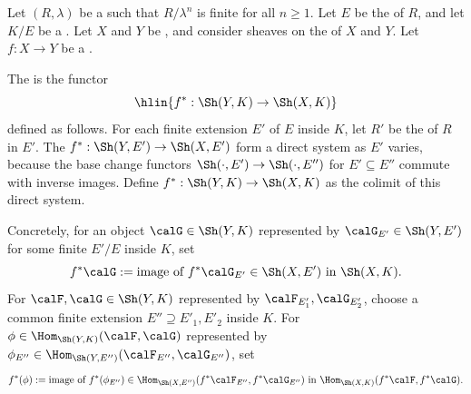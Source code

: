 \begin{definition} \label{definition:inverse_image_functor_on_etale_sheaves_with_algebraic_adic_coefficients_on_a_noetherian_scheme}
Let $(R, \lambda)$ be a   such that $R/\lambda^n$ is finite for all $n \geq 1$. Let $E$ be the  of $R$, and let $K/E$ be a . Let $X$ and $Y$ be , and consider sheaves on the  of $X$ and $Y$. Let $f: X \to Y$ be a .

The  is the functor
$$\hlin{f^* : \Sh(Y, K) \to \Sh(X, K)}$$
defined as follows. For each finite extension $E'$ of $E$ inside $K$, let $R'$ be the  of $R$ in $E'$. The  $f^*: \Sh(Y, E') \to \Sh(X, E')$ form a direct system as $E'$ varies, because the base change functors $\Sh(\cdot, E') \to \Sh(\cdot, E'')$ for $E' \subseteq E''$ commute with inverse images. Define $f^*: \Sh(Y, K) \to \Sh(X, K)$ as the colimit of this direct system.

Concretely, for an object $\calG \in \Sh(Y, K)$ represented by $\calG_{E'} \in \Sh(Y, E')$ for some finite $E'/E$ inside $K$, set
$$f^* \calG := \text{image of } f^* \calG_{E'} \in \Sh(X, E') \text{ in } \Sh(X, K).$$
For $\calF, \calG \in \Sh(Y, K)$ represented by $\calF_{E'_1}, \calG_{E'_2}$, choose a common finite extension $E'' \supseteq E'_1, E'_2$ inside $K$. For $\phi \in \Hom_{\Sh(Y, K)}(\calF, \calG)$ represented by $\phi_{E''} \in \Hom_{\Sh(Y, E'')}(\calF_{E''}, \calG_{E''})$, set
$$f^* (\phi) := \text{image of } f^*(\phi_{E''}) \in \Hom_{\Sh(X, E'')}(f^* \calF_{E''}, f^* \calG_{E''}) \text{ in } \Hom_{\Sh(X, K)}(f^* \calF, f^* \calG).$$
\end{definition}
